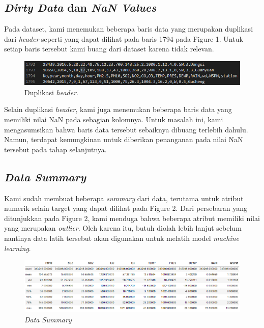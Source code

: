\documentclass{article}
\begin{document}
\begin{normalsize}
        \subsection{\textit{Dirty Data} dan \textit{NaN Values}}
        Pada dataset, kami menemukan beberapa baris data yang merupakan duplikasi dari \textit{header}
        seperti yang dapat dilihat pada baris 1794 pada Figure 1. Untuk setiap baris tersebut kami buang
        dari dataset karena tidak relevan.

        \begin{figure}[h!]
            \centering
            \includegraphics[width=0.8\linewidth]{dirty_data.PNG}
            \caption{Duplikasi \textit{header}.}
            \label{fig:dirty_data}
        \end{figure}

        \noindent Selain duplikasi \textit{header}, kami juga menemukan beberapa baris data yang memiliki nilai NaN
        pada sebagian kolomnya. Untuk masalah ini, kami mengasumsikan bahwa baris data tersebut sebaiknya
        dibuang terlebih dahulu. Namun, terdapat kemungkinan untuk diberikan penanganan pada nilai NaN 
        tersebut pada tahap selanjutnya.

        \subsection{\textit{Data Summary}}
        Kami sudah membuat beberapa \textit{summary} dari data, terutama untuk atribut numerik selain target yang
        dapat dilihat pada Figure 2. Dari persebaran yang ditunjukkan pada Figure 2, kami menduga bahwa beberapa 
        atribut memiliki nilai yang merupakan \textit{outlier}. Oleh karena itu, butuh diolah lebih lanjut sebelum
        nantinya data latih tersebut akan digunakan untuk melatih model \textit{machine learning}.
        \begin{figure}[h!]
            \centering
            \includegraphics[width=\linewidth]{data_summary.PNG}
            \caption{\textit{Data Summary}}
            \label{fig:data_summary}
        \end{figure}


\end{normalsize}
\end{document}
